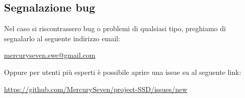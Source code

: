 \subsection{Segnalazione bug}

Nel caso si riscontrassero bug o problemi di qualsiasi tipo, preghiamo di segnalarlo al seguente indirizzo email:
\newline{}\centerline{\url{mercuryseven.swe@gmail.com}}
Oppure per utenti più esperti è possibile aprire una issue su  al seguente link:
\newline{}\centerline{\url{https://github.com/MercurySeven/project-SSD/issues/new}}
